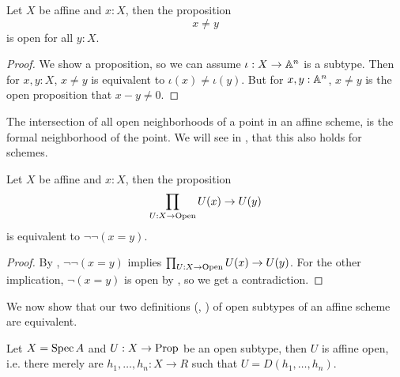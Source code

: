 \begin{lemma}%
  \label{open-inequality-subtype}
  Let $X$ be affine and $x:X$, then the proposition
  \[ x\neq y \]
  is open for all $y:X$.
\end{lemma}

\begin{proof}
  We show a proposition, so we can assume $\iota: X\to \mathbb{A}^n$ is a subtype.
  Then for $x,y:X$, $x\neq y$ is equivalent to $\iota(x)\neq\iota(y)$.
  But for $x,y:\mathbb{A}^n$, $x\neq y$ is the open proposition that $x-y\neq 0$.
\end{proof}

The intersection of all open neighborhoods of a point in an affine scheme,
is the formal neighborhood of the point.
We will see in , that this also holds for schemes.

\begin{lemma}%
  \label{affine-intersection-of-all-opens}
  Let $X$ be affine and $x:X$, then the proposition
  \[ \prod_{U:X\to \mathrm{Open}}U(x)\to U(y) \]
  is equivalent to $\neg\neg (x=y)$.
\end{lemma}

\begin{proof}
  By , $\neg\neg (x=y)$ implies $\prod_{U:X\to \mathrm{Open}}U(x)\to U(y)$.
  For the other implication,
  $\neg (x=y)$ is open by , so we get a contradiction.
\end{proof}

We now show that our two definitions (, )
of open subtypes of an affine scheme are equivalent.

\begin{theorem}%
  \label{qc-open-affine-open}
  Let $X=\operatorname{Spec} A$ and $U:X\to\mathrm{Prop}$ be an open subtype,
  then $U$ is affine open, i.e. there merely are $h_1,\dots,h_n:X\to R$ such that
  $U=D(h_1,\dots,h_n)$.
\end{theorem}


